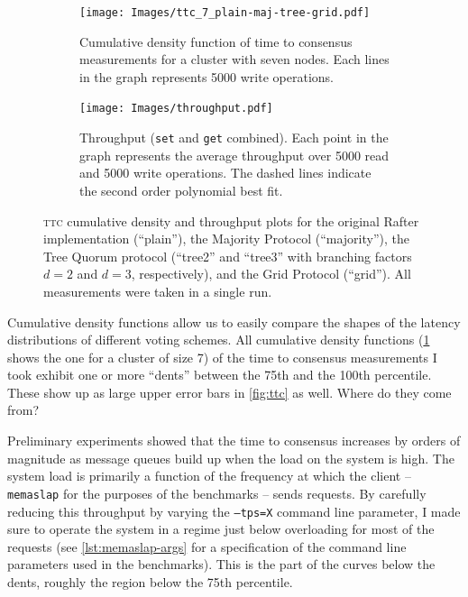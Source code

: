 \documentclass[12pt,chapterprefix=true,toc=bibliography,numbers=noendperiod,
               footnotes=multiple,twoside]{scrreprt}
\begin{document}


\begin{figure}[p]
    \centering
    \begin{subfigure}{1\textwidth}
        \centering
        \texttt{[image: Images/ttc\_7\_plain-maj-tree-grid.pdf]}
        \caption{Cumulative density function of time to consensus measurements for a cluster with seven nodes. Each lines in the graph represents 5000 write operations.}
        \label{fig:plain-maj-tree-grid-ttc}
    \end{subfigure}
    \quad
    \begin{subfigure}{1\textwidth}
        \centering
        \texttt{[image: Images/throughput.pdf]}
        \caption{Throughput (\texttt{set} and \texttt{get} combined). Each point in the graph represents the average throughput over 5000 read and 5000 write operations. The dashed lines indicate the second order polynomial best fit.}
        \label{fig:throughput}
    \end{subfigure}
    \caption{\textsc{ttc} cumulative density and throughput plots for the original Rafter implementation (\enquote{plain}), the Majority Protocol (\enquote{majority}), the Tree Quorum protocol (\enquote{tree2} and \enquote{tree3} with branching factors \(d = 2\) and \(d = 3\), respectively), and the Grid Protocol (\enquote{grid}). All measurements were taken in a single run.}
\end{figure}

Cumulative density functions allow us to easily compare the shapes of the latency distributions of different voting schemes. All cumulative density functions (\cref{fig:plain-maj-tree-grid-ttc} shows the one for a cluster of size 7) of the time to consensus measurements I took exhibit one or more \enquote{dents} between the 75th and the 100th percentile. These show up as large upper error bars in \cref{fig:ttc} as well. Where do they come from?

Preliminary experiments showed that the time to consensus increases by orders of magnitude as message queues build up when the load on the system is high. The system load is primarily a function of the frequency at which the client -- \texttt{memaslap} for the purposes of the benchmarks -- sends requests. By carefully reducing this throughput by varying the \texttt{--tps=X} command line parameter, I made sure to operate the system in a regime just below overloading for most of the requests (see \cref{lst:memaslap-args} for a specification of the command line parameters used in the benchmarks). This is the part of the curves below the dents, roughly the region below the 75th percentile.
\end{document}
